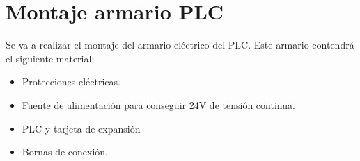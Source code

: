 \chapter{Montaje armario PLC}
\label{ane:plc}
Se va a realizar el montaje del armario eléctrico del PLC. Este armario contendrá el siguiente material:

    \begin{itemize}
        \item{Protecciones eléctricas.}
        \item{Fuente de alimentación para conseguir 24V de tensión continua.}
        \item{PLC y tarjeta de expansión}
        \item{Bornas de conexión.}
    \end{itemize}

